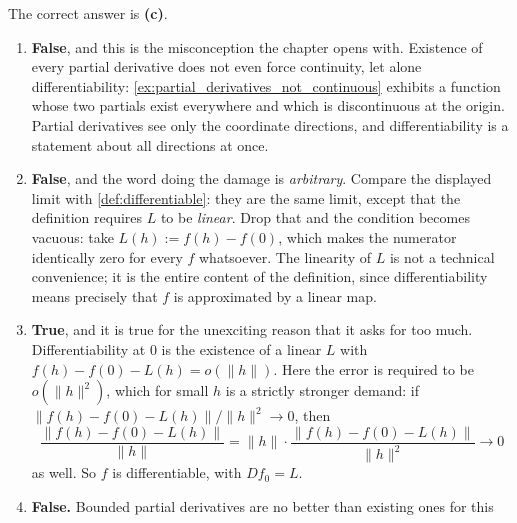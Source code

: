 \begin{exercisesolution}
\label{sol:kobel_differentiable_single_choice}
The correct answer is \textbf{(c)}.
\begin{enumerate}[label=\textbf{(\alph*)}]
  \item \textbf{False}, and this is the misconception the chapter opens with. Existence of every
    partial derivative does not even force continuity, let alone differentiability:
    \cref{ex:partial_derivatives_not_continuous} exhibits a function whose two partials exist
    everywhere and which is discontinuous at the origin. Partial derivatives see only the
    coordinate directions, and differentiability is a statement about all directions at once.
  \item \textbf{False}, and the word doing the damage is \emph{arbitrary}. Compare the displayed
    limit with \cref{def:differentiable}: they are the same limit, except that the definition
    requires $L$ to be \emph{linear}. Drop that and the condition becomes vacuous: take
    $L(h) := f(h)-f(0)$, which makes the numerator identically zero for every $f$ whatsoever. The
    linearity of $L$ is not a technical convenience; it is the entire content of the definition,
    since differentiability means precisely that $f$ is approximated by a linear map.
  \item \textbf{True}, and it is true for the unexciting reason that it asks for too much.
    Differentiability at $0$ is the existence of a linear $L$ with
    $f(h)-f(0)-L(h) = o(\lVert h\rVert)$. Here the error is required to be
    $o(\lVert h\rVert^2)$, which for small $h$ is a strictly stronger demand: if
    $\lVert f(h)-f(0)-L(h)\rVert/\lVert h\rVert^2 \to 0$, then
    \[\frac{\lVert f(h)-f(0)-L(h)\rVert}{\lVert h\rVert}
      = \lVert h\rVert \cdot \frac{\lVert f(h)-f(0)-L(h)\rVert}{\lVert h\rVert^2} \to 0\]
    as well. So $f$ is differentiable, with $Df_0 = L$.
  \item \textbf{False.} Bounded partial derivatives are no better than existing ones for this

\end{enumerate}
\end{exercisesolution}
